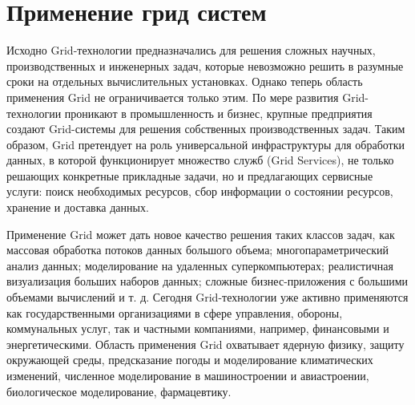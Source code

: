 \documentclass[och, referat]{SCWorks}
\begin{document}
\section{Применение грид систем}
 
Исходно Grid-технологии предназначались для решения сложных научных, производственных и инженерных задач, которые невозможно решить в разумные сроки на отдельных вычислительных установках. Однако теперь область применения Grid не ограничивается только этим. По мере развития Grid-технологии проникают в промышленность и бизнес, крупные предприятия создают Grid-системы для решения собственных производственных задач. Таким образом, Grid претендует на роль универсальной инфраструктуры для обработки данных, в которой функционирует множество служб (Grid Services), не только решающих конкретные прикладные задачи, но и предлагающих сервисные услуги: поиск необходимых ресурсов, сбор информации о состоянии ресурсов, хранение и доставка данных.

Применение Grid может дать новое качество решения таких классов задач, как массовая обработка потоков данных большого объема; многопараметрический анализ данных; моделирование на удаленных суперкомпьютерах; реалистичная визуализация больших наборов данных; сложные бизнес-приложения с большими объемами вычислений и т. д. Сегодня Grid-технологии уже активно применяются как государственными организациями в сфере управления, обороны, коммунальных услуг, так и частными компаниями, например, финансовыми и энергетическими. Область применения Grid охватывает ядерную физику, защиту окружающей среды, предсказание погоды и моделирование климатических изменений, численное моделирование в машиностроении и авиастроении, биологическое моделирование, фармацевтику.
\end{document}
